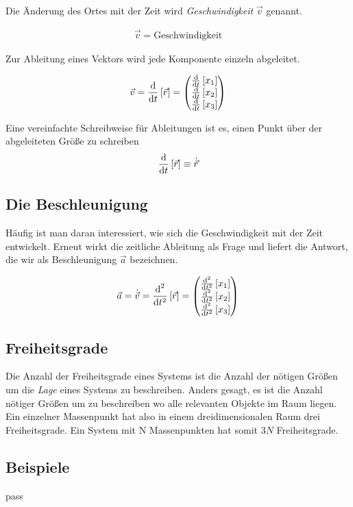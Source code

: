 Die Änderung des Ortes mit der Zeit wird \textit{Geschwindigkeit} $\vec{v}$ genannt.

\begin{align}
	\vec{v} = \text{Geschwindigkeit}
\end{align}

Zur Ableitung eines Vektors wird jede Komponente einzeln abgeleitet.

\begin{align}
	\vec{v}=\frac{\text{d}}{\text{d}t}\left[\vec{r}\right] = \begin{pmatrix} \frac{\text{d}}{\text{d}t}\left[x_1\right]\\\frac{\text{d}}{\text{d}t}\left[x_2\right]\\\frac{\text{d}}{\text{d}t}\left[x_3\right] \end{pmatrix}
\end{align}

Eine vereinfachte Schreibweise für Ableitungen ist es,  einen Punkt über der abgeleiteten Größe zu schreiben
\begin{align}
	\frac{\text{d}}{\text{d}t}\left[\vec{r}\right] \equiv \dot{\vec{r}}
\end{align}

\subsection{Die Beschleunigung}
Häufig ist man daran interessiert, wie sich die Geschwindigkeit mit der Zeit entwickelt. Erneut wirkt die zeitliche Ableitung als Frage und liefert die Antwort, die wir als Beschleunigung $\vec{a}$ bezeichnen.

\begin{align}
	\vec{a}=\dot{\vec{v}}=\frac{\text{d}^2}{\text{d}t^2}\left[\vec{r}\right] = \begin{pmatrix} \frac{\text{d}^2}{\text{d}t^2}\left[x_1\right]\\\frac{\text{d}^2}{\text{d}t^2}\left[x_2\right]\\\frac{\text{d}^2}{\text{d}t^2}\left[x_3\right] \end{pmatrix}
\end{align}

\subsection{Freiheitsgrade}
Die Anzahl der Freiheitsgrade eines Systems ist die Anzahl der nötigen Größen um die \textit{Lage} eines Systems zu beschreiben. Anders gesagt, es ist die Anzahl nötiger Größen um zu beschreiben wo alle relevanten Objekte im Raum liegen. Ein einzelner Massenpunkt hat also in einem dreidimensionalen Raum drei Freiheitsgrade. Ein System mit N Massenpunkten hat somit $3N$ Freiheitsgrade.

\subsection{Beispiele}
pass


